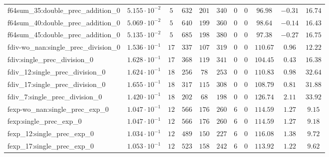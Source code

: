 \begin{tabular}{|l|c|c|c|c|c|c|c|c|c|c|}
f64sum\_35:double\_prec\_addition\_0           & $ 5.155 \cdot 10^{-2} $ & $ 5      $ & $ 632    $ & $ 201   $ & $ 340   $ & $ 0   $ & $ 0 $ & $ 96.98       $ & $ -0.31   $ & $ 16.74   $ \\
f64sum\_40:double\_prec\_addition\_0           & $ 5.069 \cdot 10^{-2} $ & $ 5      $ & $ 640    $ & $ 199   $ & $ 360   $ & $ 0   $ & $ 0 $ & $ 98.64       $ & $ -0.14   $ & $ 16.43   $ \\
f64sum\_45:double\_prec\_addition\_0           & $ 5.135 \cdot 10^{-2} $ & $ 5      $ & $ 685    $ & $ 198   $ & $ 380   $ & $ 0   $ & $ 0 $ & $ 97.38       $ & $ -0.27   $ & $ 16.75   $ \\
fdiv-wo\_nan:single\_prec\_division\_0         & $ 1.536 \cdot 10^{-1} $ & $ 17     $ & $ 337    $ & $ 107   $ & $ 319   $ & $ 0   $ & $ 0 $ & $ 110.67      $ & $ 0.96    $ & $ 12.22   $ \\
fdiv:single\_prec\_division\_0                 & $ 1.628 \cdot 10^{-1} $ & $ 17     $ & $ 368    $ & $ 119   $ & $ 341   $ & $ 0   $ & $ 0 $ & $ 104.45      $ & $ 0.43    $ & $ 16.38   $ \\
fdiv\_12:single\_prec\_division\_0             & $ 1.624 \cdot 10^{-1} $ & $ 18     $ & $ 256    $ & $ 78    $ & $ 253   $ & $ 0   $ & $ 0 $ & $ 110.83      $ & $ 0.98    $ & $ 32.64   $ \\
fdiv\_17:single\_prec\_division\_0             & $ 1.655 \cdot 10^{-1} $ & $ 18     $ & $ 317    $ & $ 115   $ & $ 308   $ & $ 0   $ & $ 0 $ & $ 108.79      $ & $ 0.81    $ & $ 31.88   $ \\
fdiv\_7:single\_prec\_division\_0              & $ 1.420 \cdot 10^{-1} $ & $ 18     $ & $ 202    $ & $ 68    $ & $ 198   $ & $ 0   $ & $ 0 $ & $ 126.74      $ & $ 2.11    $ & $ 33.92   $ \\
fexp-wo\_nan:single\_prec\_exp\_0              & $ 1.047 \cdot 10^{-1} $ & $ 12     $ & $ 566    $ & $ 176   $ & $ 260   $ & $ 6   $ & $ 0 $ & $ 114.59      $ & $ 1.27    $ & $ 9.15    $ \\
fexp:single\_prec\_exp\_0                      & $ 1.047 \cdot 10^{-1} $ & $ 12     $ & $ 566    $ & $ 176   $ & $ 260   $ & $ 6   $ & $ 0 $ & $ 114.59      $ & $ 1.27    $ & $ 9.18    $ \\
fexp\_12:single\_prec\_exp\_0                  & $ 1.034 \cdot 10^{-1} $ & $ 12     $ & $ 489    $ & $ 150   $ & $ 227   $ & $ 6   $ & $ 0 $ & $ 116.08      $ & $ 1.38    $ & $ 9.72    $ \\
fexp\_17:single\_prec\_exp\_0                  & $ 1.053 \cdot 10^{-1} $ & $ 12     $ & $ 523    $ & $ 158   $ & $ 242   $ & $ 6   $ & $ 0 $ & $ 113.92      $ & $ 1.22    $ & $ 9.62    $ \\

\end{tabular}
